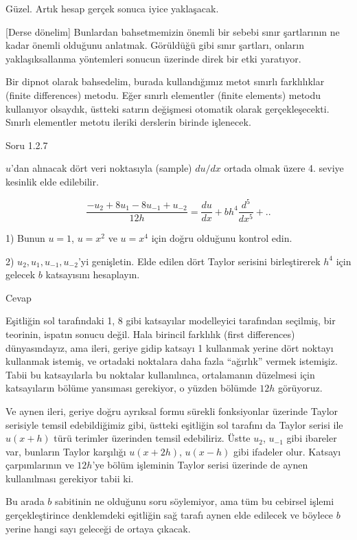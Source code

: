 \documentclass[12pt,fleqn]{article}\usepackage{../../common}
\begin{document}
Güzel. Artık hesap gerçek sonuca iyice yaklaşacak. 

[Derse dönelim] Bunlardan bahsetmemizin önemli bir sebebi sınır şartlarının
ne kadar önemli olduğunu anlatmak. Görüldüğü gibi sınır şartları, onların
yaklaşıksallanma yöntemleri sonucun üzerinde direk bir etki yaratıyor.

Bir dipnot olarak bahsedelim, burada kullandığımız metot sınırlı
farklılıklar (finite differences) metodu. Eğer sınırlı elementler (finite
elements) metodu kullanıyor olsaydık, üstteki satırın değişmesi otomatik
olarak gerçekleşecekti. Sınırlı elementler metotu ileriki derslerin birinde
işlenecek.

Soru 1.2.7

$u$'dan alınacak dört veri noktasıyla (sample) $du/dx$ ortada olmak üzere
4. seviye kesinlik elde edilebilir.

$$
\frac{-u_2 + 8u_1 - 8u_{-1} + u_{-2}}{12h} = \frac{du}{dx} + bh^4
\frac{d^5}{dx^5} + ..
$$

1) Bunun $u=1$, $u=x^2$ ve $u=x^4$ için doğru olduğunu kontrol edin.

2) $u_2,u_1,u_{-1},u_{-2}$'yi genişletin. Elde edilen dört Taylor serisini
birleştirerek $h^4$ için gelecek $b$ katsayısını hesaplayın. 

Cevap

Eşitliğin sol tarafındaki 1, 8 gibi katsayılar modelleyici tarafından seçilmiş,
bir teorinin, ispatın sonucu değil. Hala birincil farklılık (first differences)
dünyasındayız, ama ileri, geriye gidip katsayı 1 kullanmak yerine dört noktayı
kullanmak istemiş, ve ortadaki noktalara daha fazla ``ağırlık'' vermek
istemişiz. Tabii bu katsayılarla bu noktalar kullanılınca, ortalamanın düzelmesi
için katsayıların bölüme yansıması gerekiyor, o yüzden bölümde $12h$ görüyoruz.

Ve aynen ileri, geriye doğru ayrıksal formu sürekli fonksiyonlar üzerinde
Taylor serisiyle temsil edebildiğimiz gibi, üstteki eşitliğin sol tarafını
da Taylor serisi ile $u(x+h)$ türü terimler üzerinden temsil
edebiliriz. Üstte $u_{2}$, $u_{-1}$ gibi ibareler var, bunların Taylor
karşılığı $u(x+2h)$, $u(x-h)$ gibi ifadeler olur. Katsayı çarpımlarının ve
$12h$'ye bölüm işleminin Taylor serisi üzerinde de aynen kullanılması
gerekiyor tabii ki. 

Bu arada $b$ sabitinin ne olduğunu soru söylemiyor, ama tüm bu cebirsel
işlemi gerçekleştirince denklemdeki eşitliğin sağ tarafı aynen elde
edilecek ve böylece $b$ yerine hangi sayı geleceği de ortaya çıkacak.
\end{document}
